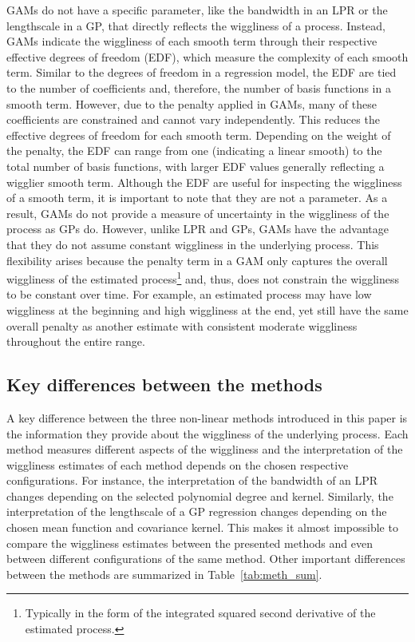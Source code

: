 \documentclass[man, floatsintext]{apa7}
\begin{document}
GAMs do not have a specific parameter, like the bandwidth in an LPR or the
lengthscale in a GP, that directly reflects the wiggliness of a process.
Instead, GAMs indicate the wiggliness of each smooth term through their
respective effective degrees of freedom (EDF), which measure the complexity of
each smooth term. Similar to the degrees of freedom in a regression model, the
EDF are tied to the number of coefficients and, therefore, the number of basis
functions in a smooth term. However, due to the penalty applied in GAMs, many
of these coefficients are constrained and cannot vary independently. This
reduces the effective degrees of freedom for each smooth term. Depending on the
weight of the penalty, the EDF can range from one (indicating a linear smooth)
to the total number of basis functions, with larger EDF values generally
reflecting a wigglier smooth term. Although the EDF are useful for inspecting
the wiggliness of a smooth term, it is important to note that they are not a
parameter. As a result, GAMs do not provide a measure of uncertainty in the
wiggliness of the process as GPs do. However, unlike LPR and GPs, GAMs have the
advantage that they do not assume constant wiggliness in the underlying
process. This flexibility arises because the penalty term in a GAM only
captures the overall wiggliness of the estimated process\footnote{Typically in
  the form of the integrated squared second derivative of the estimated
  process.}
and, thus, does not constrain the wiggliness to be constant over time. For
example, an estimated process may have low wiggliness at the beginning and high
wiggliness at the end, yet still have the same overall penalty as another
estimate with consistent moderate wiggliness throughout the entire range.

\subsection{Key differences between the methods}

A key difference between the three non-linear methods introduced in this paper
is the information they provide about the wiggliness of the underlying process.
Each method measures different aspects of the wiggliness and the interpretation
of the wiggliness estimates of each method depends on the chosen respective
configurations. For instance, the interpretation of the bandwidth of an LPR
changes depending on the selected polynomial degree and kernel. Similarly, the
interpretation of the lengthscale of a GP regression changes depending on the
chosen mean function and covariance kernel. This makes it almost impossible to
compare the wiggliness estimates between the presented methods and even between
different configurations of the same method. Other important differences
between the methods are summarized in Table~\ref{tab:meth_sum}.
\end{document}
